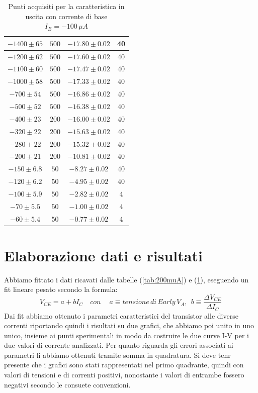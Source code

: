 \documentclass[]{article}
\begin{document}
\begin{table}[H]
\begin{tabular}{|c|c|c|c|}
		\hline
		$ -1400\pm 65 $ &$ 500 $ & $ -17.80\pm 0.02 $ &40 \\
		\hline
		$ -1200\pm 62 $ &$ 500 $ & $ -17.60\pm 0.02 $ &40 \\
		\hline
		$ -1100\pm 60 $ &$ 500 $ & $ -17.47\pm 0.02 $ &40 \\
		\hline
		$ -1000\pm 58 $ &$ 500 $ & $ -17.33\pm 0.02 $ &40 \\
		\hline
		$ -700\pm 54 $ &$ 500 $ & $ -16.86\pm 0.02 $ &40 \\
		\hline
		$ -500\pm 52 $ &$ 500 $ & $ -16.38\pm 0.02 $ &40 \\
		\hline
		$ -400\pm 23 $ &$ 200 $ & $ -16.00\pm 0.02 $ &40 \\
		\hline
		$ -320\pm 22 $ &$ 200 $ & $-15.63\pm 0.02 $ &40 \\
		\hline
		$-280\pm 22 $ &$ 200 $ & $ -15.32\pm 0.02 $ &40 \\
		\hline
		$ -200\pm 21 $ &$ 200 $ & $ -10.81\pm 0.02 $ &40 \\
		\hline
		$ -150\pm 6.8 $ &$ 50 $ & $ -8.27\pm 0.02 $ &40 \\
		\hline
		$ -120\pm 6.2 $ &$ 50 $ & $ -4.95\pm 0.02 $ &40 \\
		\hline
		$ -100\pm 5.9 $ &$ 50 $ & $ -2.82\pm 0.02 $ &4 \\
		\hline
		$ -70\pm 5.5 $ &$ 50 $ & $ -1.00\pm 0.02 $ &4 \\
		\hline
		$ -60\pm 5.4 $ &$ 50 $ & $ -0.77\pm 0.02 $ &4 \\
		\hline
	\end{tabular}
\caption{Punti acquisiti per la caratteristica in uscita con corrente di base $ I_{B}= -100\, \mu A $}
\label{tab:100muA}
\end{table}
\section{Elaborazione dati e risultati}

Abbiamo fittato i dati ricavati dalle tabelle (\ref{tab:200muA}) e (\ref{tab:100muA}), eseguendo un fit lineare pesato secondo la formula: 
\begin{equation}
	V_{CE}=a+bI_{C} \quad con\quad \:a\equiv tensione\, di\, Early \,V_{A},\:\: b\equiv\frac{\Delta V_{CE}}{\Delta I_{C}}
	\label{fitlin}
\end{equation}
Dai fit abbiamo ottenuto i parametri caratteristici del transistor alle diverse correnti riportando quindi i risultati su due grafici, che abbiamo poi unito in uno unico, insieme ai punti sperimentali in modo da costruire le due curve I-V per i due valori di corrente analizzati. Per quanto riguarda gli errori associati ai parametri li abbiamo ottenuti tramite somma in quadratura. Si deve tenr presente che i grafici sono stati rappresentati nel primo quadrante, quindi con valori di tensioni e di correnti positivi, nonostante i valori di entrambe fossero negativi secondo le consuete convenzioni.
\end{document}
